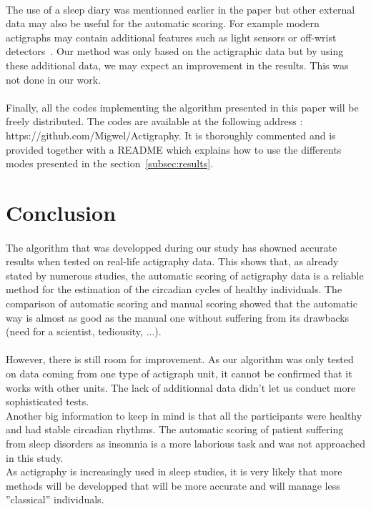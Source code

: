 \documentclass[a4paper,12pt]{article}
\begin{document}
\paragraph{}
The use of a sleep diary was mentionned earlier in the paper but other external data may also be useful for the automatic scoring. For example modern actigraphs may contain additional features such as light sensors or off-wrist detectors~\cite{LisaJ.MeltzerHawleyE.Montgomery-DownsSalvatoreP.Insana2012}. Our method was only based on the actigraphic data but by using these additional data, we may expect an improvement in the results. This was not done in our work.

\paragraph{}
Finally, all the codes implementing the algorithm presented in this paper will be freely distributed. The codes are available at the following address : https://github.com/Migwel/Actigraphy. It is thoroughly commented and is provided together with a README which explains how to use the differents modes presented in the section~\ref{subsec:results}.


\newpage

\section{Conclusion}

\paragraph{}
The algorithm that was developped during our study has showned accurate results when tested on real-life actigraphy data. This shows that, as already stated by numerous studies, the automatic scoring of actigraphy data is a reliable method for the estimation of the circadian cycles of healthy individuals. The comparison of automatic scoring and manual scoring showed that the automatic way is almost as good as the manual one without suffering from its drawbacks (need for a scientist, tediousity, ...).

\paragraph{}
However, there is still room for improvement. As our algorithm was only tested on data coming from one type of actigraph unit, it cannot be confirmed that it works with other units. The lack of additionnal data didn't let us conduct more sophisticated tests. \\
Another big information to keep in mind is that all the participants were healthy and had stable circadian rhythms. The automatic scoring of patient suffering from sleep disorders as insomnia is a more laborious task and was not approached in this study. \\
As actigraphy is increasingly used in sleep studies, it is very likely that more methods will be developped that will be more accurate and will manage less ''classical'' individuals.
\end{document}
